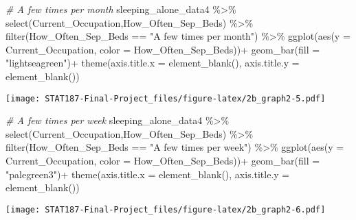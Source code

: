 \documentclass[
]{article}
\newenvironment{Shaded}{\begin{snugshade}}{\end{snugshade}}
\newcommand{\AttributeTok}[1]{\textcolor[rgb]{0.77,0.63,0.00}{#1}}
\newcommand{\CommentTok}[1]{\textcolor[rgb]{0.56,0.35,0.01}{\textit{#1}}}
\newcommand{\FunctionTok}[1]{\textcolor[rgb]{0.00,0.00,0.00}{#1}}
\newcommand{\NormalTok}[1]{#1}
\newcommand{\SpecialCharTok}[1]{\textcolor[rgb]{0.00,0.00,0.00}{#1}}
\newcommand{\StringTok}[1]{\textcolor[rgb]{0.31,0.60,0.02}{#1}}
\begin{document}
\begin{Shaded}
\begin{Highlighting}[]
\CommentTok{\# A few times per month }
\NormalTok{sleeping\_alone\_data4 }\SpecialCharTok{\%\textgreater{}\%}
  \FunctionTok{select}\NormalTok{(Current\_Occupation,How\_Often\_Sep\_Beds) }\SpecialCharTok{\%\textgreater{}\%}
  \FunctionTok{filter}\NormalTok{(How\_Often\_Sep\_Beds }\SpecialCharTok{==} \StringTok{"A few times per month"}\NormalTok{) }\SpecialCharTok{\%\textgreater{}\%}
  \FunctionTok{ggplot}\NormalTok{(}\FunctionTok{aes}\NormalTok{(}\AttributeTok{y =}\NormalTok{ Current\_Occupation,}
             \AttributeTok{color =}\NormalTok{ How\_Often\_Sep\_Beds))}\SpecialCharTok{+}
  \FunctionTok{geom\_bar}\NormalTok{(}\AttributeTok{fill =} \StringTok{"lightseagreen"}\NormalTok{)}\SpecialCharTok{+}
  \FunctionTok{theme}\NormalTok{(}\AttributeTok{axis.title.x =} \FunctionTok{element\_blank}\NormalTok{(),}
        \AttributeTok{axis.title.y =} \FunctionTok{element\_blank}\NormalTok{())}
\end{Highlighting}
\end{Shaded}

\texttt{[image: STAT187-Final-Project\_files/figure-latex/2b\_graph2-5.pdf]}

\begin{Shaded}
\begin{Highlighting}[]
\CommentTok{\# A few times per week}
\NormalTok{sleeping\_alone\_data4 }\SpecialCharTok{\%\textgreater{}\%}
  \FunctionTok{select}\NormalTok{(Current\_Occupation,How\_Often\_Sep\_Beds) }\SpecialCharTok{\%\textgreater{}\%}
  \FunctionTok{filter}\NormalTok{(How\_Often\_Sep\_Beds }\SpecialCharTok{==} \StringTok{"A few times per week"}\NormalTok{) }\SpecialCharTok{\%\textgreater{}\%}
  \FunctionTok{ggplot}\NormalTok{(}\FunctionTok{aes}\NormalTok{(}\AttributeTok{y =}\NormalTok{ Current\_Occupation,}
             \AttributeTok{color =}\NormalTok{ How\_Often\_Sep\_Beds))}\SpecialCharTok{+}
  \FunctionTok{geom\_bar}\NormalTok{(}\AttributeTok{fill =} \StringTok{"palegreen3"}\NormalTok{)}\SpecialCharTok{+}
  \FunctionTok{theme}\NormalTok{(}\AttributeTok{axis.title.x =} \FunctionTok{element\_blank}\NormalTok{(),}
        \AttributeTok{axis.title.y =} \FunctionTok{element\_blank}\NormalTok{())}
\end{Highlighting}
\end{Shaded}

\texttt{[image: STAT187-Final-Project\_files/figure-latex/2b\_graph2-6.pdf]}
\end{document}
